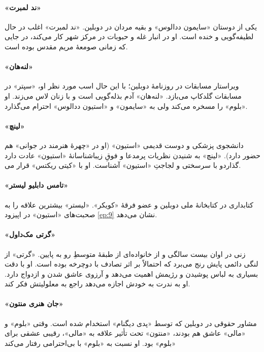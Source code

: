 \documentclass[12pt]{book}
\newcommand{\noun}[1]{«{#1}»}
\begin{document}
    \paragraph{\noun{ند لمبرت}\protect{}}
    یکی از دوستان \noun{سایمون ددالوس‬} و بقیه مردان در دوبلین. \noun{ند لمبرت} اغلب در حال لطیفه‌گویی و خنده است. او در انبار غله و حبوبات در مرکز شهر کار می‌کند، در جایی که زمانی صومعۀ مریم مقدس بوده است.
    \paragraph{\noun{لنه‌هان}\protect{}}
    ویراستار مسابقات در روزنامۀ دوبلین؛ با این حال اسب مورد نظر او، \noun{سپتر} در مسابقات گلدکاپ می‌بازد. \noun{لنه‌هان} آدم بذله‌گویی است و با زنان لاس می‌زند. او \noun{بلوم} را مسخره می‌کند ولی به \noun{سایمون}  و \noun{استیون ددالوس} احترام می‌گذارد.
    \paragraph{\noun{لینچ}\protect{}}
    دانشجوی پزشکی و دوست قدیمی \noun{استیون} (او در «چهرۀ هنرمند در جوانی» هم حضور دارد). \noun{لینچ} به شنیدن نظریات پرمدعا و فوقِ زیباشناسانۀ \noun{استیون} عادت دارد و با سرسختی و لجاجتِ \noun{استیون} آشناست. او با \noun{کیتی ریکتس} قرار می‎‌گذارد.
    \paragraph{\noun{تامس دابلیو لیستر}\protect{}}
    کتابداری در کتابخانۀ ملی دوبلین و عضو فرقۀ \noun{کویکر}. \noun{لیستر} بیشترین علاقه را به صحبت‌های \noun{استیون} در اپیزود \ref{ep:9} نشان می‌دهد.
    \paragraph{\noun{گرتی مک‌داول}\protect{}}
    زنی در اوان بیست سالگی و از خانواده‌ای از طبقۀ متوسطِ رو به پایین. \noun{گرتی} از لنگی دائمی پایش رنج می‌برد که احتمالاً بر اثر تصادف با دوچرخه بوده است. او با دقت بسیاری به لباس پوشیدن و رژیمش اهمیت می‌دهد و آرزوی عاشق شدن و ازدواج دارد. او به ندرت به خودش اجازه می‌دهد راجع به معلولیتش فکر کند.
    \paragraph{\noun{جان هنری منتون}\protect{}}
    مشاور حقوقی در دوبلین که توسط \noun{پدی دیگنام} استخدام شده است. وقتی \noun{بلوم} و \noun{مالی} عاشق هم بودند، \noun{منتون} تحت تأثیر علاقه به \noun{مالی}، رقیبی عشقی برای \noun{بلوم} بود. او نسبت به \noun{بلوم} با بی‌احترامی رفتار می‌کند
\end{document}
